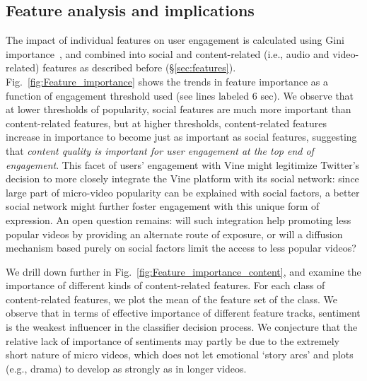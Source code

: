 \subsection{Feature analysis and implications}
The impact of individual features on user engagement is calculated using Gini importance~\cite{louppe2013understanding}, and combined into social  and content-related (i.e., audio and video-related) features as described before (\S\ref{sec:features}). Fig.~\ref{fig:Feature_importance} shows the trends in  feature importance as a function of engagement threshold used (see lines labeled 6 sec). We observe that at lower thresholds of popularity, social features are much more important than content-related features, but at higher thresholds, content-related features increase in importance to become just as important as social features, suggesting that \emph{content quality is important for user engagement at the top end of engagement}. This facet of users' engagement with Vine might legitimize Twitter's decision to more closely integrate the Vine platform with its social network: since large part of micro-video popularity can be explained with social factors, a better social network might further foster engagement with this unique form of expression. An open question remains: will such integration help promoting  less popular videos  by providing an alternate route of exposure, or will  a diffusion mechanism based purely on social factors limit the access to less popular videos?



We drill down further in Fig.~\ref{fig:Feature_importance_content}, and examine the importance of different kinds of content-related features. For each class of content-related features, we plot the mean of the feature set of the class. We observe that in terms of effective importance of different feature tracks, sentiment is the weakest influencer in the classifier decision process. We conjecture that the relative lack of importance of sentiments may partly be due to the extremely short nature of micro videos, which does not let emotional `story arcs' and plots (e.g., drama) to develop as strongly as in longer videos.


